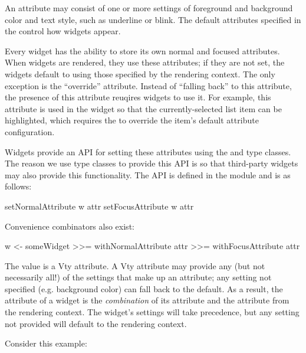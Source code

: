 An attribute may consist of one or more settings of foreground and
background color and text style, such as underline or blink.  The
default attributes specified in the  control how
widgets appear.

Every widget has the ability to store its own normal and focused
attributes.  When widgets are rendered, they use these attributes; if
they are not set, the widgets default to using those specified by the
rendering context.  The only exception is the ``override'' attribute.
Instead of ``falling back'' to this attribute, the presence of this
attribute reuqires widgets to use it.  For example, this attribute is
used in the  widget so that the currently-selected list item
can be highlighted, which requires the  to override the
item's default attribute configuration.

Widgets provide an API for setting these attributes using the
 and  type classes.  The reason we
use type classes to provide this API is so that third-party widgets
may also provide this functionality.  The API is defined in the
 module and is as follows:

\begin{haskellcode}
 setNormalAttribute w attr
 setFocusAttribute w attr
\end{haskellcode}

Convenience combinators also exist:

\begin{haskellcode}
 w <- someWidget
      >>= withNormalAttribute attr
      >>= withFocusAttribute attr
\end{haskellcode}

The  value is a Vty attribute.  A Vty attribute may provide
any (but not necessarily all!) of the settings that make up an
attribute; any setting not specified (e.g. background color) can fall
back to the default.  As a result, the attribute of a widget is the
\textit{combination} of its attribute and the attribute from the
rendering context.  The widget's settings will take precedence, but
any setting not provided will default to the rendering context.

Consider this example:


